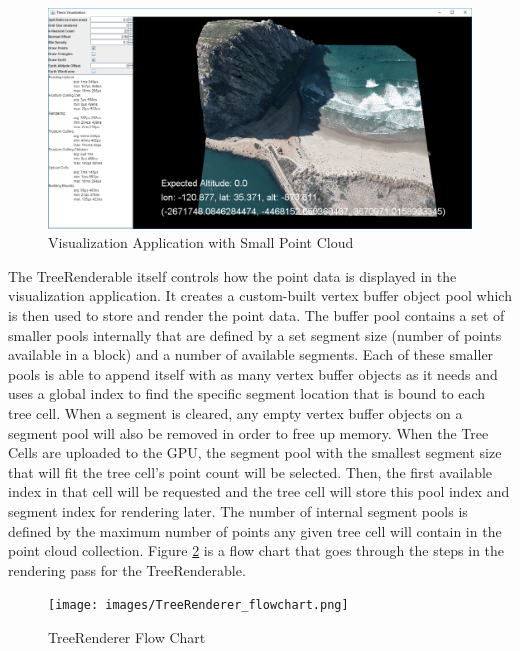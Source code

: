 \begin{figure}[htp]
\begin{center}
  \includegraphics[width=.9\linewidth]{images/visualization.png}
  \caption{Visualization Application with Small Point Cloud}
  \label{fig:visualization}
\end{center}
\end{figure}

The TreeRenderable itself controls how the point data is displayed in the
visualization application. It creates a custom-built vertex buffer object pool
which is then used to store and render the point data. The buffer pool contains
a set of smaller pools internally that are defined by a set segment size (number
of points available in a block) and a number of available segments. Each of
these smaller pools is able to append itself with as many vertex buffer objects
as it needs and uses a global index to find the specific segment location that
is bound to each tree cell. When a segment is cleared, any empty vertex buffer
objects on a segment pool will also be removed in order to free up memory. When
the Tree Cells are uploaded to the GPU, the segment pool with the smallest
segment size that will fit the tree cell's point count will be selected. Then,
the first available index in that cell will be requested and the tree cell will
store this pool index and segment index for rendering later. The number of
internal segment pools is defined by the maximum number of points any given tree
cell will contain in the point cloud collection. Figure \ref{fig:flowchart} is a
flow chart that goes through the steps in the rendering pass for the
TreeRenderable.

\begin{figure}[htp]
\begin{center}
  \texttt{[image: images/TreeRenderer\_flowchart.png]}
  \caption{TreeRenderer Flow Chart}
  \label{fig:flowchart}
\end{center}
\end{figure}

